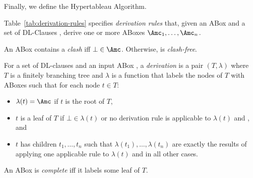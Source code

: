 

Finally, we define the Hypertableau Algorithm.

\begin{definition}

  Table~\ref{tab:derivation-rules} specifies \emph{derivation rules} that, given an ABox \A and a
  set of DL-Clauses \Cmc, derive one or more ABoxes $\A_{1},\dots,\A_{n}$.

  An ABox \A contains a \emph{clash} iff $\bot\in\A$. Otherwise, \A is \emph{clash-free}. 
  
  For a set of DL-clauses \Cmc and an input ABox \A, a \emph{derivation} is a pair $(T,\lambda)$
  where $T$ is a finitely branching tree and $\lambda$ is a function that labels the nodes of $T$
  with ABoxes such that for each node $t\in T$:
  \begin{itemize}
  \item $\lambda(t)=\A$ if $t$ is the root of $T$,
  \item $t$ is a leaf of $T$ if $\bot\in\lambda(t)$ or no derivation rule is applicable to
    $\lambda(t)$ and \Cmc, and
  \item $t$ has children $t_{1},\dots,t_{n}$ such that $\lambda(t_{1}),\dots,\lambda(t_{n})$ are
    exactly the results of applying one applicable rule to $\lambda(t)$ and \Cmc in all other
    cases.
  \end{itemize}
  An ABox is \emph{complete} iff it labels some leaf of $T$.
\end{definition}

